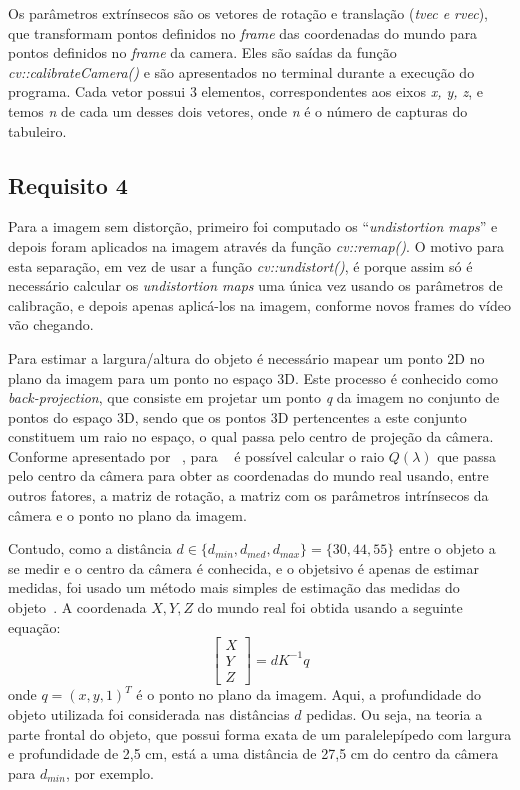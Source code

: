 \documentclass{bmvc2k}
\begin{document}
Os parâmetros extrínsecos são os vetores de rotação e translação (\textit{tvec e rvec}), que transformam pontos definidos no \textit{frame} das coordenadas do mundo para pontos definidos no \textit{frame} da camera. Eles são saídas da função \textit{cv::calibrateCamera()} e são apresentados no terminal durante a execução do programa. Cada vetor possui 3 elementos, correspondentes aos eixos \textit{x, y, z}, e temos \textit{n} de cada um desses dois vetores, onde \textit{n} é o número de capturas do tabuleiro.

\subsection{Requisito 4}
\label{Met:Req4}
Para a imagem sem distorção, primeiro foi computado os ``\textit{undistortion maps}'' e depois foram aplicados na imagem através da função \textit{cv::remap()}. O motivo para esta separação, em vez de usar a função \textit{cv::undistort()}, é porque assim só é necessário calcular os \textit{undistortion maps} uma única vez usando os parâmetros de calibração, e depois apenas aplicá-los na imagem, conforme novos frames do vídeo vão chegando. 

Para estimar a largura/altura do objeto é necessário mapear um ponto 2D no plano da imagem para um ponto no espaço 3D. Este processo é conhecido como \textit{back-projection}, que consiste em projetar um ponto \textit{q} da imagem no conjunto de pontos do espaço 3D, sendo que os pontos 3D pertencentes a este conjunto constituem um raio no espaço, o qual passa pelo centro de projeção da câmera. Conforme apresentado por ~\cite{relatoriomoodle}, para ~\cite{phdcoord} é possível calcular o raio $Q(\lambda)$ que passa pelo centro da câmera para obter as coordenadas do mundo real usando, entre outros fatores, a matriz de rotação, a matriz com os parâmetros intrínsecos da câmera e o ponto no plano da imagem.

Contudo, como a distância $d \in \{d_{min}, d_{med}, d_{max}\} = \{30, 44, 55\}$ entre o objeto a se medir e o centro da câmera é conhecida, e o objetsivo é apenas de estimar medidas, foi usado um método mais simples de estimação das medidas do objeto~\cite{webpage}. A coordenada $X, Y, Z$ do mundo real foi obtida usando a seguinte equação: \begin{equation}
\begin{bmatrix}
X \\
Y \\
Z 
\end{bmatrix} = dK^{-1}q 
\end{equation} onde $q = (x, y, 1)^{T}$ é o ponto no plano da imagem. Aqui, a profundidade do objeto utilizada foi considerada nas distâncias $d$ pedidas. Ou seja, na teoria a parte frontal do objeto, que possui forma exata de um paralelepípedo com largura e profundidade de 2,5 cm, está a uma distância de 27,5 cm do centro da câmera para $d_{min}$, por exemplo. 
\end{document}

